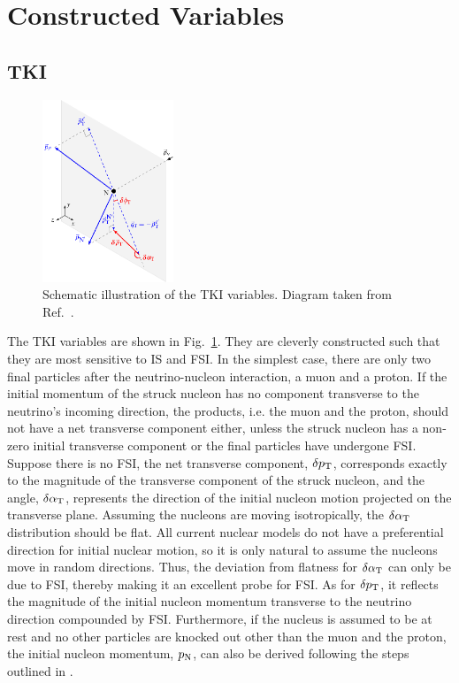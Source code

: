 \section{Constructed Variables}
     \subsection{TKI}
        \begin{figure}[!htb] 	
            \centering 		
            \includegraphics[width=0.35\textwidth]{figures/stki.eps}
            \caption{\label{fig:stki} Schematic illustration of the TKI variables. Diagram taken from Ref.~\cite{Lu:2015tcr}.} 
        \end{figure}
    
       The TKI variables are shown in Fig.~\ref{fig:stki}. They are cleverly constructed such that they are most sensitive to IS and FSI. 
       In the simplest case, there are only two final particles after the neutrino-nucleon interaction, a muon and a proton. 
       If the initial momentum of the struck nucleon has no component transverse to the neutrino's incoming direction, the products, i.e. the muon and the proton, should not have a net transverse component either, unless the struck nucleon has a non-zero initial transverse component or the final particles have undergone FSI.
       Suppose there is no FSI, the net transverse component, $\delta p_\textrm{T}$, corresponds exactly to the magnitude of the transverse component of the struck nucleon, and the angle, $\delta\alpha_\textrm{T}$, represents the direction of the initial nucleon motion projected on the transverse plane. 
       Assuming the nucleons are moving isotropically, the $\delta\alpha_\textrm{T}$ distribution should be flat. 
       All current nuclear models do not have a preferential direction for initial nuclear motion, so it is only natural to assume the nucleons move in random directions. 
       Thus, the deviation from flatness for $\delta\alpha_\textrm{T}$ can only be due to FSI, thereby making it an excellent probe for FSI. 
       As for $\delta p_\textrm{T}$, it reflects the magnitude of the initial nucleon momentum transverse to the neutrino direction compounded by FSI. 
       Furthermore, if the nucleus is assumed to be at rest and no other particles are knocked out other than the muon and the proton, the initial nucleon momentum, $p_\textrm{N}$, can also be derived following the steps outlined in \cite{pnpaper}. 
 
